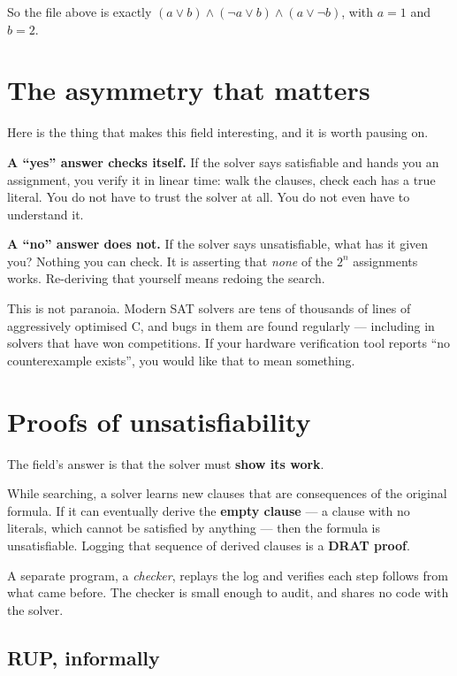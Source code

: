\documentclass[11pt,a4paper]{article}
\begin{document}
So the file above is exactly
$(a \lor b) \land (\lnot a \lor b) \land (a \lor \lnot b)$, with $a=1$ and
$b=2$.

\section{The asymmetry that matters}
\label{sec:asymmetry}

Here is the thing that makes this field interesting, and it is worth pausing
on.

\textbf{A ``yes'' answer checks itself.} If the solver says satisfiable and
hands you an assignment, you verify it in linear time: walk the clauses, check
each has a true literal. You do not have to trust the solver at all. You do not
even have to understand it.

\textbf{A ``no'' answer does not.} If the solver says unsatisfiable, what has
it given you? Nothing you can check. It is asserting that \emph{none} of the
$2^n$ assignments works. Re-deriving that yourself means redoing the search.

This is not paranoia. Modern SAT solvers are tens of thousands of lines of
aggressively optimised C, and bugs in them are found regularly --- including in
solvers that have won competitions. If your hardware verification tool reports
``no counterexample exists'', you would like that to mean something.

\section{Proofs of unsatisfiability}

The field's answer is that the solver must \textbf{show its work}.

While searching, a solver learns new clauses that are consequences of the
original formula. If it can eventually derive the \textbf{empty clause} --- a
clause with no literals, which cannot be satisfied by anything --- then the
formula is unsatisfiable. Logging that sequence of derived clauses is a
\textbf{DRAT proof}.

A separate program, a \emph{checker}, replays the log and verifies each step
follows from what came before. The checker is small enough to audit, and shares
no code with the solver.

\subsection*{RUP, informally}
\end{document}
